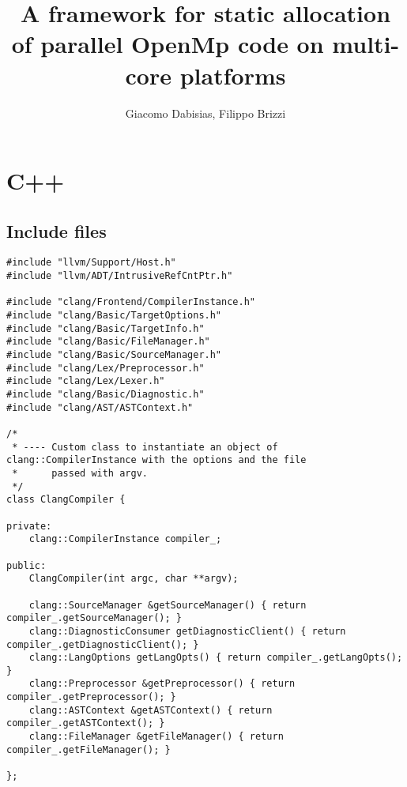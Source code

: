 \documentclass[a4paper,10pt,twoside]{book}
\author{Giacomo Dabisias, Filippo Brizzi}
\title{A framework for static allocation of parallel OpenMp code on multi-core platforms}
\begin{document}
\tableofcontents
\chapter{C++}
\section{Include files}

\begin{lstlisting}[language=CCC, caption=driver/compiler.h]
#include "llvm/Support/Host.h"
#include "llvm/ADT/IntrusiveRefCntPtr.h"

#include "clang/Frontend/CompilerInstance.h"
#include "clang/Basic/TargetOptions.h"
#include "clang/Basic/TargetInfo.h"
#include "clang/Basic/FileManager.h"
#include "clang/Basic/SourceManager.h"
#include "clang/Lex/Preprocessor.h"
#include "clang/Lex/Lexer.h"
#include "clang/Basic/Diagnostic.h"
#include "clang/AST/ASTContext.h"

/*
 * ---- Custom class to instantiate an object of clang::CompilerInstance with the options and the file
 * 		passed with argv.
 */
class ClangCompiler {

private:
	clang::CompilerInstance compiler_;

public:
	ClangCompiler(int argc, char **argv);
	
	clang::SourceManager &getSourceManager() { return compiler_.getSourceManager(); }
	clang::DiagnosticConsumer getDiagnosticClient() { return compiler_.getDiagnosticClient(); }
	clang::LangOptions getLangOpts() { return compiler_.getLangOpts(); }
	clang::Preprocessor &getPreprocessor() { return compiler_.getPreprocessor(); }
	clang::ASTContext &getASTContext() { return compiler_.getASTContext(); }
	clang::FileManager &getFileManager() { return compiler_.getFileManager(); }

};
\end{lstlisting}
\end{document}
